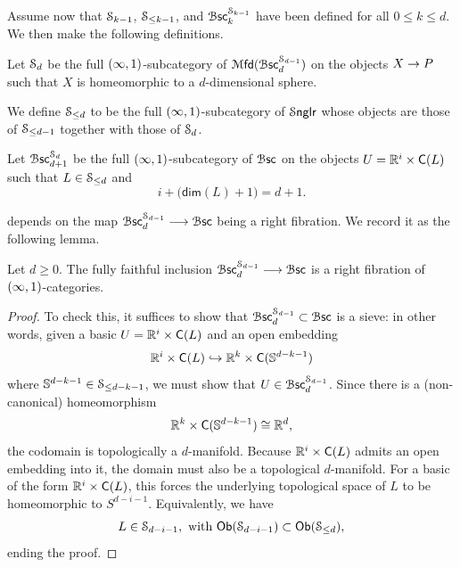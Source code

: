 Assume now that $\mathcal S_{k-1}$, $\mathcal S_{\leq k-1}$, and $\operatorname{\mathcal B\mathsf{sc}}^{\mathcal S_{k-1}}_{k}$ have been defined for all $0\leq k \leq d$. We then make the following definitions.
\begin{definition}\label{ch5:: def: sphere sieve}
    Let $\mathcal S_{d}$ be the full $(\operatorname{\infty},1)$-subcategory of $\operatorname{{\mathcal M}\mathsf{fd}}(\operatorname{\mathcal B\mathsf{sc}}_{d}^{\mathcal S_{d-1}})$ on the objects $X\rightarrow P$ such that $X$ is homeomorphic to a $d$-dimensional sphere. 

    We define $\mathcal S_{\leq d}$ to be the full $(\operatorname{\infty},1)$-subcategory of $\operatorname{\mathcal S{\sf nglr}}$ whose objects are those of $\mathcal S_{\leq d-1}$ together with those of $\mathcal S_{d}$.
\end{definition}
 

\begin{definition}
    Let $\operatorname{\mathcal B\mathsf{sc}}_{d+1}^{\mathcal S_{d}}$ be the full $(\operatorname{\infty},1)$-subcategory of $\operatorname{\mathcal B\mathsf{sc}}$ on the objects $U= \mathbb R^{i}\times \mathsf C(L)$ such that $L\in \mathcal S_{\leq d}$ and
    \begin{equation}
        i + \big(\mathsf{dim}(L)+1\big) = d+1.
    \end{equation}
\end{definition}

 depends on the map $\operatorname{\mathcal B\mathsf{sc}}_{d}^{\mathcal S_{d-1}} \longrightarrow \operatorname{\mathcal B\mathsf{sc}}$ being a right fibration. We record it as the following lemma.


\begin{lemma}\label{ch5:: lem: sieve of spheres}
    Let $d \geq 0$. The fully faithful inclusion  
    $\operatorname{\mathcal B\mathsf{sc}}_{d}^{\mathcal S_{d-1}} \longrightarrow \operatorname{\mathcal B\mathsf{sc}}$ 
    is a right fibration of $(\operatorname{\infty},1)$-categories.
\end{lemma} 
\begin{proof}
To check this, it suffices to show that $\operatorname{\mathcal B\mathsf{sc}}_{d}^{\mathcal S_{d-1}} \subset \operatorname{\mathcal B\mathsf{sc}}$ is a sieve: in other words, given a basic $U = \mathbb R^{i}\times \mathsf C(L)$ and an open embedding  
\begin{equation}
    \mathbb R^{i}\times \mathsf C(L) \hookrightarrow \mathbb R^{k} \times \mathsf C(\mathbb S^{d-k-1})
\end{equation}
where $\mathbb S^{d-k-1} \in \mathcal S_{\leq d-k-1}$, we must show that $U \in \operatorname{\mathcal B\mathsf{sc}}_{d}^{\mathcal S_{d-1}}$. Since there is a (non-canonical) homeomorphism
\begin{equation}
    \mathbb R^{k} \times \mathsf C(\mathbb S^{d-k-1}) \cong \mathbb R^{d},
\end{equation}
the codomain is topologically a $d$-manifold. Because $\mathbb R^{i}\times \mathsf C(L)$ admits an open embedding into it, the domain must also be a topological $d$-manifold. For a basic of the form $\mathbb R^{i}\times \mathsf C(L)$, this forces the underlying topological space of $L$ to be homeomorphic to $S^{d-i-1}$. Equivalently, we have
\begin{equation}
L \in \mathcal S_{d-i-1}, \text{ with } \mathsf{Ob}(\mathcal S_{d-i-1}) \subset \mathsf{Ob}(\mathcal S_{\leq d}),  
\end{equation}
ending the proof.
\end{proof}


